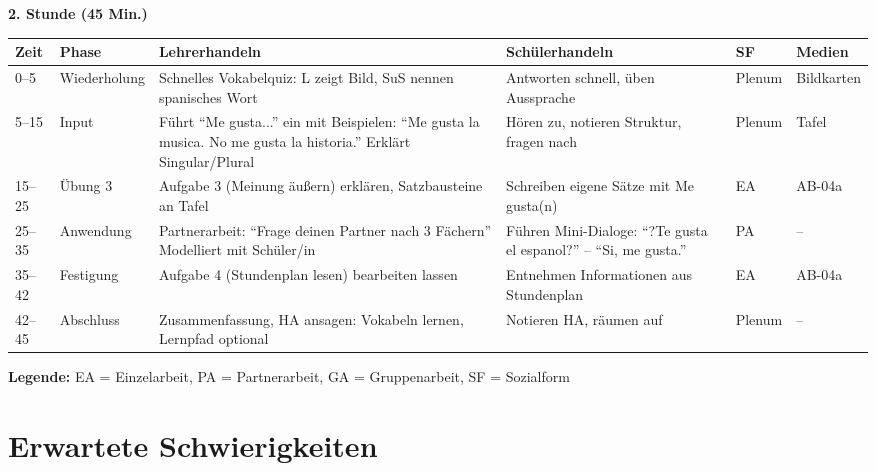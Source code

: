 \documentclass[11pt,a4paper]{article}
\begin{document}
\vspace{1em}

\textbf{2. Stunde (45 Min.)}

\begin{longtable}{|p{1cm}|p{1.5cm}|p{4cm}|p{3cm}|p{2cm}|p{2cm}|}
\hline
\textbf{Zeit} & \textbf{Phase} & \textbf{Lehrerhandeln} & \textbf{Schülerhandeln} & \textbf{SF} & \textbf{Medien} \\
\hline
\endhead

0--5 & Wiederholung & Schnelles Vokabelquiz: L zeigt Bild, SuS nennen spanisches Wort & Antworten schnell, üben Aussprache & Plenum & Bildkarten \\
\hline

5--15 & Input & Führt ``Me gusta...'' ein mit Beispielen: ``Me gusta la musica. No me gusta la historia.'' Erklärt Singular/Plural & Hören zu, notieren Struktur, fragen nach & Plenum & Tafel \\
\hline

15--25 & Übung 3 & Aufgabe 3 (Meinung äußern) erklären, Satzbausteine an Tafel & Schreiben eigene Sätze mit Me gusta(n) & EA & AB-04a \\
\hline

25--35 & Anwendung & Partnerarbeit: ``Frage deinen Partner nach 3 Fächern'' Modelliert mit Schüler/in & Führen Mini-Dialoge: ``?Te gusta el espanol?'' -- ``Si, me gusta.'' & PA & -- \\
\hline

35--42 & Festigung & Aufgabe 4 (Stundenplan lesen) bearbeiten lassen & Entnehmen Informationen aus Stundenplan & EA & AB-04a \\
\hline

42--45 & Abschluss & Zusammenfassung, HA ansagen: Vokabeln lernen, Lernpfad optional & Notieren HA, räumen auf & Plenum & -- \\
\hline
\end{longtable}

\textbf{Legende:} EA = Einzelarbeit, PA = Partnerarbeit, GA = Gruppenarbeit, SF = Sozialform

\section{Erwartete Schwierigkeiten}
\end{document}
